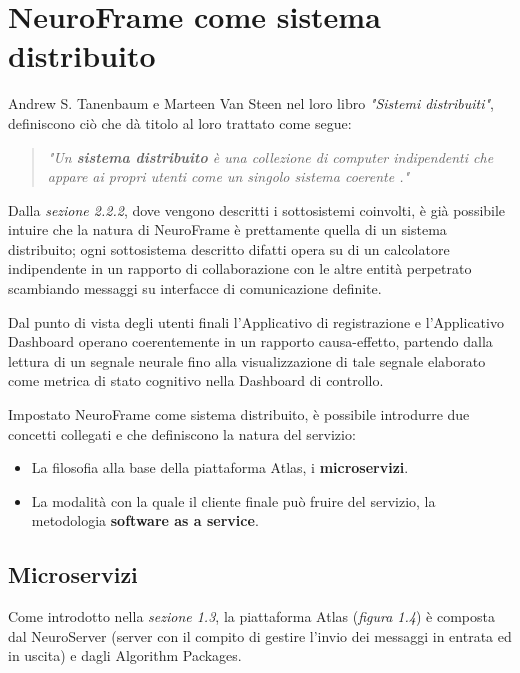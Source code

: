 \section{NeuroFrame come sistema distribuito}
Andrew S. Tanenbaum e Marteen Van Steen nel loro libro \emph{"Sistemi distribuiti"}, definiscono ciò che dà titolo al loro trattato come segue:\newline
\begin{quotation}
    \emph{"Un {\bf sistema distribuito} è una collezione di computer indipendenti che appare ai propri utenti come un singolo sistema coerente \cite{sistema_distribuito}."}
\end{quotation}
Dalla \emph{sezione 2.2.2}, dove vengono descritti i sottosistemi coinvolti, è già possibile intuire che la natura di NeuroFrame è prettamente quella di un sistema distribuito; ogni sottosistema descritto difatti opera su di un calcolatore indipendente in un rapporto di collaborazione con le altre entità perpetrato scambiando messaggi su interfacce di comunicazione definite.\newline

\noindent Dal punto di vista degli utenti finali l'Applicativo di registrazione e l'Applicativo Dashboard operano coerentemente in un rapporto causa-effetto, partendo dalla lettura di un segnale neurale fino alla visualizzazione di tale segnale elaborato come metrica di stato cognitivo nella Dashboard di controllo.\newline

\noindent Impostato NeuroFrame come sistema distribuito, è possibile introdurre due concetti collegati e che definiscono la natura del servizio:
\begin{itemize}
    \item La filosofia alla base della piattaforma Atlas, i {\bf microservizi}.
    \item La modalità con la quale il cliente finale può fruire del servizio, la metodologia {\bf software as a service}.
\end{itemize}
\vspace{5mm}
\subsection{Microservizi}
Come introdotto nella \emph{sezione 1.3}, la piattaforma Atlas (\emph{figura 1.4}) è composta dal NeuroServer (server con il compito di gestire l'invio dei messaggi in entrata ed in uscita) e dagli Algorithm Packages.\newline

